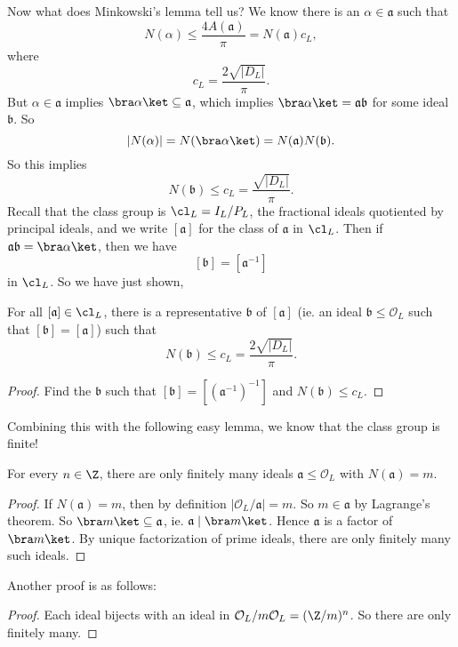 \documentclass[a4paper]{article}
\begin{document}
Now what does Minkowski's lemma tell us? We know there is an $\alpha \in \mathfrak{a}$ such that
\[
  N(\alpha) \leq \frac{4A(\mathfrak{a})}{\pi} = N(\mathfrak{a}) c_L,
\]
where
\[
  c_L = \frac{2\sqrt{|D_L|}}{\pi}.
\]
But $\alpha \in \mathfrak{a}$ implies $\bra \alpha\ket \subseteq \mathfrak{a}$, which implies $\bra \alpha\ket = \mathfrak{a} \mathfrak{b}$ for some ideal $\mathfrak{b}$. So
\[
  |N(\alpha)| = N(\bra \alpha\ket) = N(\mathfrak{a})N(\mathfrak{b}).
\]
So this implies
\[
  N(\mathfrak{b}) \leq c_L = \frac{\sqrt{|D_L|}}{\pi}.
\]
Recall that the class group is $\cl_L = I_L/P_L$, the fractional ideals quotiented by principal ideals, and we write $[\mathfrak{a}]$ for the class of $\mathfrak{a}$ in $\cl_L$. Then if $\mathfrak{a}\mathfrak{b} = \bra \alpha\ket$, then we have
\[
  [\mathfrak{b}] = [\mathfrak{a}^{-1}]
\]
in $\cl_L$. So we have just shown,
\begin{prop}
  For all $[\mathfrak{a}] \in \cl_L$, there is a representative $\mathfrak{b}$ of $[\mathfrak{a}]$ (ie. an ideal $\mathfrak{b} \leq \mathcal{O}_L$ such that $[\mathfrak{b}] = [\mathfrak{a}]$) such that
  \[
    N(\mathfrak{b}) \leq c_L = \frac{2\sqrt{|D_L|}}{\pi}.
  \]
\end{prop}

\begin{proof}
  Find the $\mathfrak{b}$ such that $[\mathfrak{b}] = [(\mathfrak{a}^{-1})^{-1}]$ and $N(\mathfrak{b}) \leq c_L$.
\end{proof}

Combining this with the following easy lemma, we know that the class group is finite!
\begin{lemma}
  For every $n \in \Z$, there are only finitely many ideals $\mathfrak{a} \leq \mathcal{O}_L$ with $N(\mathfrak{a}) = m$.
\end{lemma}

\begin{proof}
  If $N(\mathfrak{a}) = m$, then by definition $|\mathcal{O}_L/\mathfrak{a}| = m$. So $m \in \mathfrak{a}$ by Lagrange's theorem. So $\bra m \ket \subseteq \mathfrak{a}$, ie. $\mathfrak{a} \mid \bra m\ket$. Hence $\mathfrak{a}$ is a factor of $\bra m\ket$. By unique factorization of prime ideals, there are only finitely many such ideals.
\end{proof}

Another proof is as follows:
\begin{proof}
  Each ideal bijects with an ideal in $\mathcal{O}_L/m\mathcal{O}_L = (\Z/m)^n$. So there are only finitely many.
\end{proof}
\end{document}
